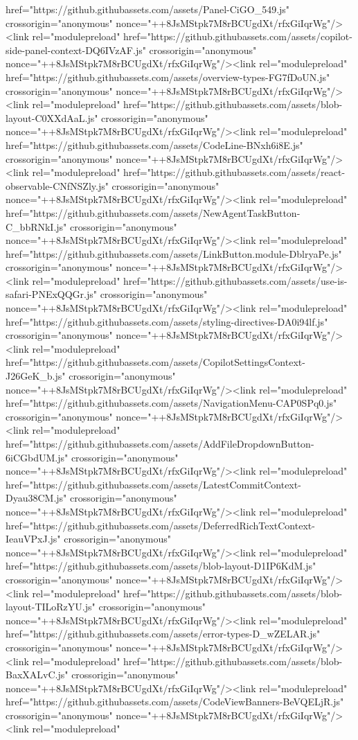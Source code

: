 href="https://github.githubassets.com/assets/Panel-CiGO_549.js" crossorigin="anonymous" nonce="++8JsMStpk7M8rBCUgdXt/rfxGiIqrWg"/><link rel="modulepreload" href="https://github.githubassets.com/assets/copilot-side-panel-context-DQ6IVzAF.js" crossorigin="anonymous" nonce="++8JsMStpk7M8rBCUgdXt/rfxGiIqrWg"/><link rel="modulepreload" href="https://github.githubassets.com/assets/overview-types-FG7fDoUN.js" crossorigin="anonymous" nonce="++8JsMStpk7M8rBCUgdXt/rfxGiIqrWg"/><link rel="modulepreload" href="https://github.githubassets.com/assets/blob-layout-C0XXdAaL.js" crossorigin="anonymous" nonce="++8JsMStpk7M8rBCUgdXt/rfxGiIqrWg"/><link rel="modulepreload" href="https://github.githubassets.com/assets/CodeLine-BNxh6i8E.js" crossorigin="anonymous" nonce="++8JsMStpk7M8rBCUgdXt/rfxGiIqrWg"/><link rel="modulepreload" href="https://github.githubassets.com/assets/react-observable-CNfNSZly.js" crossorigin="anonymous" nonce="++8JsMStpk7M8rBCUgdXt/rfxGiIqrWg"/><link rel="modulepreload" href="https://github.githubassets.com/assets/NewAgentTaskButton-C_bbRNkI.js" crossorigin="anonymous" nonce="++8JsMStpk7M8rBCUgdXt/rfxGiIqrWg"/><link rel="modulepreload" href="https://github.githubassets.com/assets/LinkButton.module-DblryaPe.js" crossorigin="anonymous" nonce="++8JsMStpk7M8rBCUgdXt/rfxGiIqrWg"/><link rel="modulepreload" href="https://github.githubassets.com/assets/use-is-safari-PNExQQGr.js" crossorigin="anonymous" nonce="++8JsMStpk7M8rBCUgdXt/rfxGiIqrWg"/><link rel="modulepreload" href="https://github.githubassets.com/assets/styling-directives-DA0i94lf.js" crossorigin="anonymous" nonce="++8JsMStpk7M8rBCUgdXt/rfxGiIqrWg"/><link rel="modulepreload" href="https://github.githubassets.com/assets/CopilotSettingsContext-J26GeK_b.js" crossorigin="anonymous" nonce="++8JsMStpk7M8rBCUgdXt/rfxGiIqrWg"/><link rel="modulepreload" href="https://github.githubassets.com/assets/NavigationMenu-CAP0SPq0.js" crossorigin="anonymous" nonce="++8JsMStpk7M8rBCUgdXt/rfxGiIqrWg"/><link rel="modulepreload" href="https://github.githubassets.com/assets/AddFileDropdownButton-6iCGbdUM.js" crossorigin="anonymous" nonce="++8JsMStpk7M8rBCUgdXt/rfxGiIqrWg"/><link rel="modulepreload" href="https://github.githubassets.com/assets/LatestCommitContext-Dyau38CM.js" crossorigin="anonymous" nonce="++8JsMStpk7M8rBCUgdXt/rfxGiIqrWg"/><link rel="modulepreload" href="https://github.githubassets.com/assets/DeferredRichTextContext-IeauVPxJ.js" crossorigin="anonymous" nonce="++8JsMStpk7M8rBCUgdXt/rfxGiIqrWg"/><link rel="modulepreload" href="https://github.githubassets.com/assets/blob-layout-D1IP6KdM.js" crossorigin="anonymous" nonce="++8JsMStpk7M8rBCUgdXt/rfxGiIqrWg"/><link rel="modulepreload" href="https://github.githubassets.com/assets/blob-layout-TILoRzYU.js" crossorigin="anonymous" nonce="++8JsMStpk7M8rBCUgdXt/rfxGiIqrWg"/><link rel="modulepreload" href="https://github.githubassets.com/assets/error-types-D_wZELAR.js" crossorigin="anonymous" nonce="++8JsMStpk7M8rBCUgdXt/rfxGiIqrWg"/><link rel="modulepreload" href="https://github.githubassets.com/assets/blob-BaxXALvC.js" crossorigin="anonymous" nonce="++8JsMStpk7M8rBCUgdXt/rfxGiIqrWg"/><link rel="modulepreload" href="https://github.githubassets.com/assets/CodeViewBanners-BeVQELjR.js" crossorigin="anonymous" nonce="++8JsMStpk7M8rBCUgdXt/rfxGiIqrWg"/><link rel="modulepreload" 